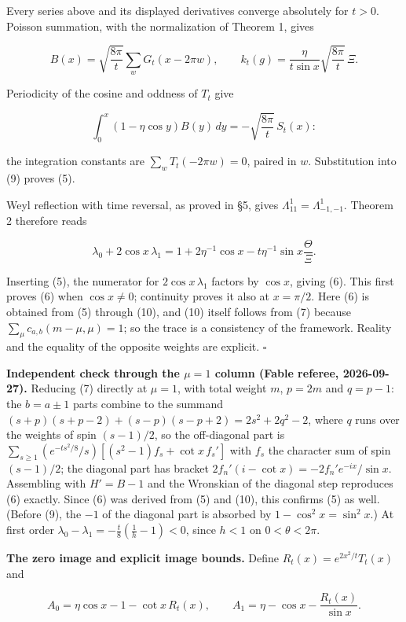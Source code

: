 \documentclass[11pt,a4paper]{article}
\begin{document}
Every series above and its displayed derivatives converge absolutely for
\(t>0\). Poisson summation, with the normalization of Theorem 1, gives

\[B(x)=\sqrt{\frac{8\pi}t}\sum_wG_t(x-2\pi w),\qquad
k_t(g)=\frac{\eta}{t\sin x}\sqrt{\frac{8\pi}t}\,\Xi.\]

Periodicity of the cosine and oddness of \(T_t\) give

\[\int_0^x(1-\eta\cos y)B(y)\,dy
=-\sqrt{\frac{8\pi}t}\,S_t(x):\]

the integration constants are \(\sum_wT_t(-2\pi w)=0\), paired in \(w\).
Substitution into (9) proves (5).

Weyl reflection with time reversal, as proved in §5, gives
\(\Lambda^1_{11}=\Lambda^1_{-1,-1}\). Theorem 2 therefore reads

\[\lambda_0+2\cos x\,\lambda_1
=1+2\eta^{-1}\cos x-t\eta^{-1}\sin x\frac{\Theta}{\Xi}. \tag{10}\]

Inserting (5), the numerator for \(2\cos x\,\lambda_1\) factors by
\(\cos x\), giving (6). This first proves (6) when \(\cos x\ne0\);
continuity proves it also at \(x=\pi/2\). Here (6) is obtained from (5)
through (10), and (10) itself follows from (7) because
\(\sum_\mu c_{a,b}(m-\mu,\mu)=1\); so the trace is a consistency of the
framework. Reality and the equality of the opposite weights are
explicit. \(\square\)

\textbf{Independent check through the \(\mu=1\) column (Fable referee,
2026-09-27).} Reducing (7) directly at \(\mu=1\), with total weight
\(m\), \(p=2m\) and \(q=p-1\): the \(b=a\pm1\) parts combine to the
summand \((s+p)(s+p-2)+(s-p)(s-p+2)=2s^2+2q^2-2\), where \(q\) runs over
the weights of spin \((s-1)/2\), so the off-diagonal part is
\(\sum_{s\ge1}(e^{-ts^2/8}/s)[(s^2-1)f_s+\cot x\,f_s']\) with \(f_s\)
the character sum of spin \((s-1)/2\); the diagonal part has bracket
\(2f_n'(i-\cot x)=-2f_n'e^{-ix}/\sin x\). Assembling with \(H'=B-1\) and
the Wronskian of the diagonal step reproduces (6) exactly. Since (6) was
derived from (5) and (10), this confirms (5) as well. (Before (9), the
\(-1\) of the diagonal part is absorbed by \(1-\cos^2x=\sin^2x\).) At
first order \(\lambda_0-\lambda_1=-\frac t8(\frac1h-1)<0\), since
\(h<1\) on \(0<\theta<2\pi\).

\textbf{The zero image and explicit image bounds.} Define
\(R_t(x)=e^{2x^2/t}T_t(x)\) and

\[A_0=\eta\cos x-1-\cot x\,R_t(x),\qquad
A_1=\eta-\cos x-\frac{R_t(x)}{\sin x}.\]
\end{document}
